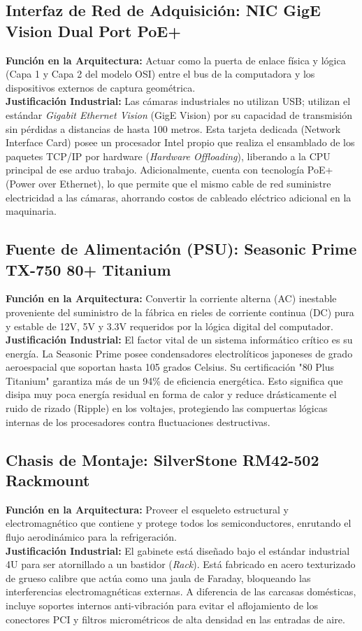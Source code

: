 \documentclass[12pt,letterpaper]{article}
\begin{document}
\subsection{Interfaz de Red de Adquisición: NIC GigE Vision Dual Port PoE+}
\textbf{Función en la Arquitectura:} Actuar como la puerta de enlace física y lógica (Capa 1 y Capa 2 del modelo OSI) entre el bus de la computadora y los dispositivos externos de captura geométrica.
\\
\textbf{Justificación Industrial:} Las cámaras industriales no utilizan USB; utilizan el estándar \textit{Gigabit Ethernet Vision} (GigE Vision) por su capacidad de transmisión sin pérdidas a distancias de hasta 100 metros. Esta tarjeta dedicada (Network Interface Card) posee un procesador Intel propio que realiza el ensamblado de los paquetes TCP/IP por hardware (\textit{Hardware Offloading}), liberando a la CPU principal de ese arduo trabajo. Adicionalmente, cuenta con tecnología PoE+ (Power over Ethernet), lo que permite que el mismo cable de red suministre electricidad a las cámaras, ahorrando costos de cableado eléctrico adicional en la maquinaria.

\subsection{Fuente de Alimentación (PSU): Seasonic Prime TX-750 80+ Titanium}
\textbf{Función en la Arquitectura:} Convertir la corriente alterna (AC) inestable proveniente del suministro de la fábrica en rieles de corriente continua (DC) pura y estable de 12V, 5V y 3.3V requeridos por la lógica digital del computador.
\\
\textbf{Justificación Industrial:} El factor vital de un sistema informático crítico es su energía. La Seasonic Prime posee condensadores electrolíticos japoneses de grado aeroespacial que soportan hasta 105 grados Celsius. Su certificación "80 Plus Titanium" garantiza más de un 94\% de eficiencia energética. Esto significa que disipa muy poca energía residual en forma de calor y reduce drásticamente el ruido de rizado (Ripple) en los voltajes, protegiendo las compuertas lógicas internas de los procesadores contra fluctuaciones destructivas.

\subsection{Chasis de Montaje: SilverStone RM42-502 Rackmount}
\textbf{Función en la Arquitectura:} Proveer el esqueleto estructural y electromagnético que contiene y protege todos los semiconductores, enrutando el flujo aerodinámico para la refrigeración.
\\
\textbf{Justificación Industrial:} El gabinete está diseñado bajo el estándar industrial 4U para ser atornillado a un bastidor (\textit{Rack}). Está fabricado en acero texturizado de grueso calibre que actúa como una jaula de Faraday, bloqueando las interferencias electromagnéticas externas. A diferencia de las carcasas domésticas, incluye soportes internos anti-vibración para evitar el aflojamiento de los conectores PCI y filtros micrométricos de alta densidad en las entradas de aire.
\end{document}

